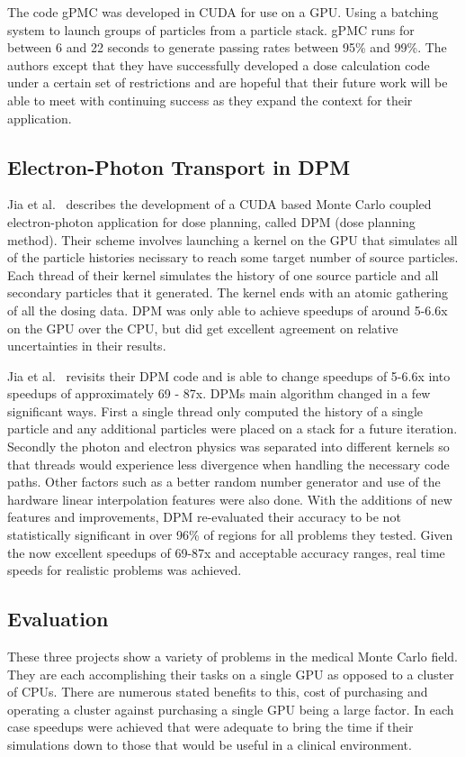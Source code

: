 %
The code gPMC was developed in CUDA for use on a GPU.
%
Using a batching system to launch groups of particles from a particle stack.
%
gPMC runs for between 6 and 22 seconds to generate passing rates between 95\% and 99\%.
%
The authors except that they have successfully developed a dose calculation code under a certain set of restrictions and are hopeful that their future work will be able to meet with continuing success as they expand the context for their application.~\cite{jia2012gpu}

\subsection*{Electron-Photon Transport in DPM }

Jia et al.~\cite{jia2010development} describes the development of a CUDA based Monte Carlo coupled electron-photon application for dose planning, called DPM (dose planning method).
%
 Their scheme involves launching a kernel on the GPU that simulates all of the particle histories necissary to reach some target number of source particles.
 Each thread of their kernel simulates the history of one source particle and all secondary particles that it generated.
 The kernel ends with an atomic gathering of all the dosing data.
 DPM was only able to achieve speedups of around 5-6.6x on the GPU over the CPU, but did get excellent agreement on relative uncertainties in their results.~\cite{jia2010development}
 
 Jia et al.~\cite{jia2011gpu} revisits their DPM code and is able to change speedups of 5-6.6x into speedups of approximately 69 - 87x.
%
DPMs main algorithm changed in a few significant ways.
%
First a single thread only computed the history of a single particle and any additional particles were placed on a stack for a future iteration.
%
Secondly the photon and electron physics was separated into different kernels so that threads would experience less divergence when handling the necessary code paths.
%
Other factors such as a better random number generator and use of the hardware linear interpolation features were also done.
%
With the additions of new features and improvements, DPM re-evaluated their accuracy to be not statistically significant in over 96\% of regions for all problems they tested.
%
Given the now excellent speedups of 69-87x and acceptable accuracy ranges, real time speeds for realistic problems was achieved.
~\cite{jia2011gpu}


\subsection*{Evaluation}

These three projects show a variety of problems in the medical Monte Carlo field.
%
They are each accomplishing their tasks on a single GPU as opposed to a cluster of CPUs.
%
There are numerous stated benefits to this, cost of purchasing and operating a cluster against purchasing a single GPU being a large factor.
%
In each case speedups were achieved that were adequate to bring the time if their simulations down to those that would be useful in a clinical environment.
%
